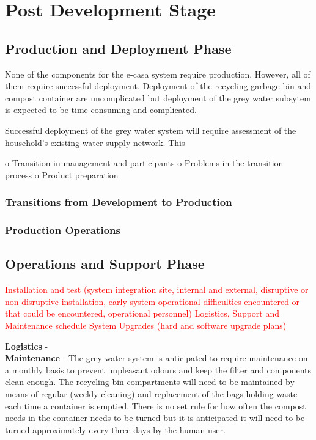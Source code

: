 \documentclass[a4paper,11pt,fleqn]{report}
\begin{document}
{\chapter{Post Development Stage}

\section{Production and Deployment Phase}
None of the components for the \ac{e-casa} system require production. However, all of them require successful deployment. Deployment of the recycling garbage bin and compost container are uncomplicated but deployment of the grey water subsytem is expected to be time consuming and complicated. 

Successful deployment of the grey water system will require assessment of the household's existing water supply network. This 

o Transition in management and participants o Problems in the transition process
o Product preparation

\subsection{Transitions from Development to Production}

\subsection{Production Operations}

\section{Operations and Support Phase}
\textcolor{red}{Installation and test (system integration site, internal and external, disruptive or non-disruptive installation, early system operational difficulties encountered or that could be encountered, operational personnel)
Logistics, Support and Maintenance schedule
System Upgrades (hard and software upgrade plans)}

\textbf{Logistics} - \\

\textbf{Maintenance} - The grey water system is anticipated to require maintenance on a monthly basis to prevent unpleasant odours and keep the filter and components clean enough. The recycling bin compartments will need to be maintained by means of regular (weekly cleaning) and replacement of the bags holding waste each time a container is emptied. There is no set rule for how often the compost needs in the container needs to be turned but it is anticipated it will need to be turned approximately every three days by the human user. \\

}
\end{document}

